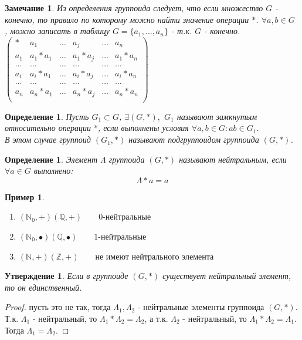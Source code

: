 \documentclass[12pt,oneside]{article}
\newtheorem{determ}[theorem]{Определение}
\newtheorem{ffff}[theorem]{Замечание}
\newtheorem{iwantthat}[theorem]{Утверждение}
\theoremstyle{definition}
\newtheorem{example}[theorem]{Пример}
\newcommand{\ZZ}{\mathbb{Z}}
\newcommand{\NN}{\mathbb{N}}
\newcommand{\QQ}{\mathbb{Q}}
\begin{document}
\begin{ffff}
	Из определения группоида следует, что если множество $G$ - конечно, то правило по которому можно найти значение операции $*$. $\forall a,b \in G$ , можно записать в таблицу $G=\{a_1, \dots, a_n\}$ - т.к. $G$  - конечно.\\
	$\begin{pmatrix}
		* & a_1 & \dots & a_j & \dots & a_n \\
		a_1& a_1*a_1 & \dots & a_1*a_j & \dots & a_1*a_n \\
		\dots &\dots &\dots &\dots &\dots &\dots \\
		a_i& a_i*a_1 & \dots & a_i*a_j & \dots & a_i*a_n \\
		\dots &\dots &\dots &\dots &\dots &\dots \\
		a_n& a_n*a_1 & \dots & a_n*a_j & \dots & a_n*a_n \\
		
	\end{pmatrix}$
\end{ffff}

\begin{determ}
	Пусть $G_1 \subset G$, $\exists (G,*),$ $G_1$ называют замкнутым относительно операции $*$, если выполнены условия $\forall a,b \in G: ab\in G_1$.\\
	В этом случае группоид $(G_1,*)$ называют подгруппоидом группоида $(G,*)$.
\end{determ}

\begin{determ}
	Элемент $\Lambda$ группоида $(G,*)$ называют нейтральным, если $\forall a \in G$ выполнено:\\
	\begin{equation}
	\Lambda*a=a
	\end{equation}
\end{determ}

\begin{example}
	\begin{enumerate}[]
		\item $(\NN_0,+)(\QQ,+) \qquad 0$-нейтральные
		\item $(\NN_0,\bullet)(\QQ,\bullet) \qquad 1$-нейтральные
		\item $(\NN,+)(\ZZ,+) \qquad $не имеют нейтрального элемента
	\end{enumerate}
\end{example}

\begin{iwantthat}
	Если в группоиде $(G,*)$ существует нейтральный элемент, то он единственный.
\end{iwantthat}
\begin{proof}
	пусть это не так, тогда $\Lambda_1, \Lambda_2$ - нейтральные элементы группоида $(G,*)$. Т.к. $\Lambda_1$ - нейтральный, то $\Lambda_1*\Lambda_2=\Lambda_2$, а т.к. $\Lambda_2$ - нейтральный, то $\Lambda_1*\Lambda_2=\Lambda_1$.\\
	Тогда $\Lambda_1=\Lambda_2$.
\end{proof}
\end{document}
